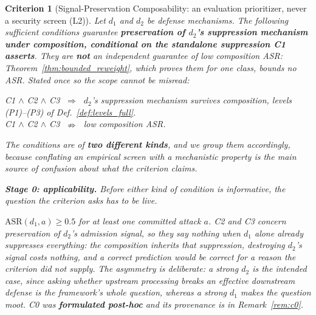 \documentclass{article}
\newtheorem{criterion}[theorem]{Criterion}
\begin{document}
\begin{criterion}[Signal-Preservation Composability: an evaluation prioritizer, never a security screen (L2)]
\label{thm:composability}
Let $d_1$ and $d_2$ be defense mechanisms. The following sufficient conditions guarantee \textbf{preservation of $d_2$'s suppression mechanism under composition, conditional on the standalone suppression C1 asserts}. They are \textbf{not} an independent guarantee of low composition ASR: Theorem~\ref{thm:bounded_reweight}, which proves them for one class, bounds no ASR. Stated once so the scope cannot be misread:
\begin{center}\small\vspace{-3pt}
C1 $\wedge$ C2 $\wedge$ C3 $\;\Rightarrow\;$ $d_2$'s suppression \emph{mechanism} survives composition, levels (P1)--(P3) of Def.~\ref{def:levels_full}.\\[1pt]
C1 $\wedge$ C2 $\wedge$ C3 $\;\nRightarrow\;$ low composition ASR.
\vspace{-3pt}\end{center}
\noindent The conditions are of \textbf{two different kinds}, and we group them accordingly, because conflating an empirical screen with a mechanistic property is the main source of confusion about what the criterion claims.

\smallskip
\noindent\textbf{Stage 0: applicability.} Before either kind of condition is informative, the question the criterion asks has to be live.
\begin{description}[noitemsep,topsep=2pt]
\item[(C0) The downstream mechanism is load-bearing.] $\mathrm{ASR}(d_1,a) \geq 0.5$ for at least one committed attack $a$. C2 and C3 concern preservation of \emph{$d_2$'s} admission signal, so they say nothing when $d_1$ alone already suppresses everything: the composition inherits that suppression, destroying $d_2$'s signal costs nothing, and a correct prediction would be correct for a reason the criterion did not supply. The asymmetry is deliberate: a strong \emph{$d_2$} is the intended case, since asking whether upstream processing breaks an effective downstream defense is the framework's whole question, whereas a strong $d_1$ makes the question moot. C0 was \textbf{formulated post-hoc} and its provenance is in Remark~\ref{rem:c0}.
\end{description}


\end{criterion}
\end{document}
